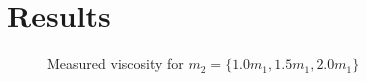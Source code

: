 \chapter{Results}

\begin{figure}[htbp]
    \begin{center}
        
        \caption{
            Measured viscosity for $m_2 = 
            \{1.0m_1, 1.5m_1, 2.0m_1\}$
        }
    \end{center}
\end{figure}
%        
%
%
%        
%
%        
%        

